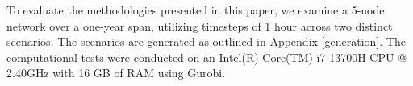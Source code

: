 \documentclass[smallextended,natbib]{svjour3}       %
\numberwithin{definition}{section}
\numberwithin{theorem}{section}
\numberwithin{proposition}{section}
\begin{document}


To evaluate the methodologies presented in this paper, we examine a  5-node network over a one-year span, utilizing timesteps of 1 hour across two distinct scenarios.
The scenarios are generated as outlined in Appendix  \ref{generation}. 
The computational tests were conducted on an Intel(R) Core(TM) i7-13700H CPU @ 2.40GHz with 16 GB of RAM using Gurobi.






  

\end{document}
